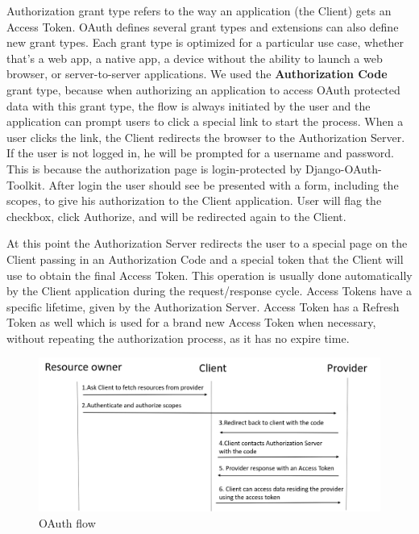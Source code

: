Authorization grant type refers to the way an application (the Client) gets an Access Token. OAuth defines several grant types and extensions can also define new grant types. Each grant type is optimized for a particular use case, whether that’s a web app, a native app, a device without the ability to launch a web browser, or server-to-server applications. We used the \textbf{Authorization Code} grant type, because when authorizing an application to access OAuth protected data with this grant type, the flow is always initiated by the user and the application can prompt users to click a special link to start the process. 
When a user clicks the link, the Client redirects the browser to the Authorization Server. If the user is not logged in, he will be prompted for a username and password. This is because the authorization page is login-protected by Django-OAuth-Toolkit. After login the user should see be presented with a form, including the scopes, to give his authorization to the Client application. User will flag the checkbox, click Authorize, and will be redirected again to the Client.

At this point the Authorization Server redirects the user to a special page on the Client passing in an Authorization Code and a special token that the Client will use to obtain the final Access Token. This operation is usually done automatically by the Client application during the request/response cycle. Access Tokens have a specific lifetime, given by the Authorization Server. Access Token has a Refresh Token as well which is used for a brand new Access Token when necessary, without repeating the authorization process, as it has no expire time.

\begin{figure}[htb]
	\centering
	\includegraphics[scale=0.3]{figures/oauth.png}
	\caption{OAuth flow}
\end{figure}



